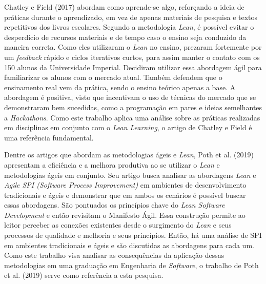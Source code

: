 \nocite{chatley2017lean}Chatley e Field (2017) abordam como aprende-se algo, reforçando a ideia de práticas durante o aprendizado, em vez de apenas materiais de pesquisa e textos repetitivos dos livros escolares. Segundo a metodologia \textit{Lean}, é possível evitar o desperdício de recursos materiais e de tempo caso o ensino seja conduzido da maneira correta. Como eles utilizaram o \textit{Lean} no ensino, prezaram fortemente por um \textit{feedback} rápido e ciclos iterativos curtos, para assim manter o contato com os 150 alunos da Universidade Imperial. Decidiram utilizar essa abordagem ágil para familiarizar os alunos com o mercado atual. Também defendem que o ensinamento real vem da prática, sendo o ensino teórico apenas a base. A abordagem é positiva, visto que incentivam o uso de técnicas do mercado que se demonstraram bem sucedidas, como a programação em pares e ideias semelhantes a \textit{Hackathons}. Como este trabalho aplica uma análise sobre as práticas realizadas em disciplinas em conjunto com o \textit{Lean Learning}, o artigo de Chatley e Field é uma referência fundamental.

Dentre os artigos que abordam as metodologias ágeis e \textit{Lean},\nocite{poth2019lean} Poth et al. (2019) apresentam a eficiência e a melhora produtiva ao se utilizar o \textit{Lean} e metodologias ágeis em conjunto. Seu artigo busca analisar as abordagens \textit{Lean} e \textit{Agile SPI (Software Process Improvement)} em ambientes de desenvolvimento tradicionais e ágeis e demonstrar que em ambos os cenários é possível buscar essas abordagens. São pontuados os princípios chave do \textit{Lean Software Development} e então revisitam o Manifesto Ágil. Essa construção permite ao leitor perceber as conexões existentes desde o surgimento do \textit{Lean} e seus processos de qualidade e melhoria e seus princípios. Então, há uma análise de SPI em ambientes tradicionais e ágeis e são discutidas as abordagens para cada um. Como este trabalho visa analisar as consequências da aplicação dessas metodologias em uma graduação em Engenharia de \textit{Software}, o trabalho de Poth et al. (2019) serve como referência a esta pesquisa.


